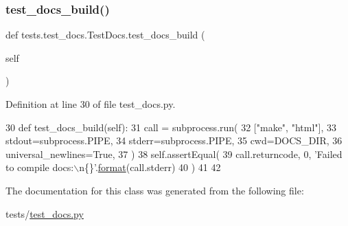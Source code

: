 \subsubsection{\texorpdfstring{test\+\_\+docs\+\_\+build()}{test\_docs\_build()}}
{\footnotesize\ttfamily def tests.\+test\+\_\+docs.\+Test\+Docs.\+test\+\_\+docs\+\_\+build (\begin{DoxyParamCaption}\item[{}]{self }\end{DoxyParamCaption})}



Definition at line 30 of file test\+\_\+docs.\+py.


\begin{DoxyCode}
30     \textcolor{keyword}{def }test\_docs\_build(self):
31         call = subprocess.run(
32             [\textcolor{stringliteral}{"make"}, \textcolor{stringliteral}{"html"}],
33             stdout=subprocess.PIPE,
34             stderr=subprocess.PIPE,
35             cwd=DOCS\_DIR,
36             universal\_newlines=\textcolor{keyword}{True},
37         )
38         self.assertEqual(
39             call.returncode, 0, \textcolor{stringliteral}{'Failed to compile docs:\(\backslash\)n\{\}'}.\hyperlink{namespaceparlai_1_1chat__service_1_1services_1_1messenger_1_1shared__utils_a32e2e2022b824fbaf80c747160b52a76}{format}(call.stderr)
40         )
41 
42 
\end{DoxyCode}


The documentation for this class was generated from the following file\+:\begin{DoxyCompactItemize}
\item 
tests/\hyperlink{test__docs_8py}{test\+\_\+docs.\+py}\end{DoxyCompactItemize}
